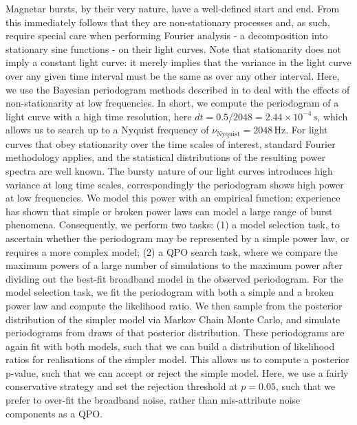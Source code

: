\documentclass[numberedappendix]{emulateapj}
\begin{document}
Magnetar bursts, by their very nature, have a well-defined start and end. From this immediately follows that they are non-stationary processes and, as such, require special care when performing Fourier analysis - a decomposition into stationary sine functions - on their light curves. Note that stationarity does not imply a constant light curve: it merely implies that the variance in the light curve over any given time interval must be the same as over any other interval. 
Here, we use the Bayesian periodogram methods described in \citet{huppenkothen13} to deal with the effects of non-stationarity at low frequencies. In short, we compute the periodogram of a light curve with a high time resolution, here $dt = 0.5/2048 = 2.44 \times 10^{-4} \, \mathrm{s}$, which allows us to search up to a Nyquist frequency of $\nu_{\mathrm{Nyquist}} = 2048 \, \mathrm{Hz}$. For light curves that obey stationarity over the time scales of interest, standard Fourier methodology applies, and the statistical distributions of the resulting power spectra are well known. The bursty nature of our light curves introduces high variance at long time scales, correspondingly the periodogram shows high power at low frequencies. We model this power with an empirical function; experience has shown that simple or broken power laws can model a large range of burst phenomena. Consequently, we perform two tasks: (1) a model selection task, to ascertain whether the periodogram may be represented by a simple power law, or requires a more complex model; (2) a QPO search task, where we compare the maximum powers of a large number of simulations to the maximum power after dividing out the best-fit broadband model in the observed periodogram. For the model selection task, we fit the periodogram with both a simple and a broken power law and compute the likelihood ratio. We then sample from the posterior distribution of the simpler model via Markov Chain Monte Carlo, and simulate periodograms from draws of that posterior distribution. These periodograms are again fit with both models, such that we can build a distribution of likelihood ratios for realisations of the simpler model. This allows us to compute a posterior p-value, such that we can accept or reject the simple model. Here, we use a fairly conservative strategy and set the rejection threshold at $p = 0.05$, such that we prefer to over-fit the broadband noise, rather than mis-attribute noise components as a QPO.
\end{document}
